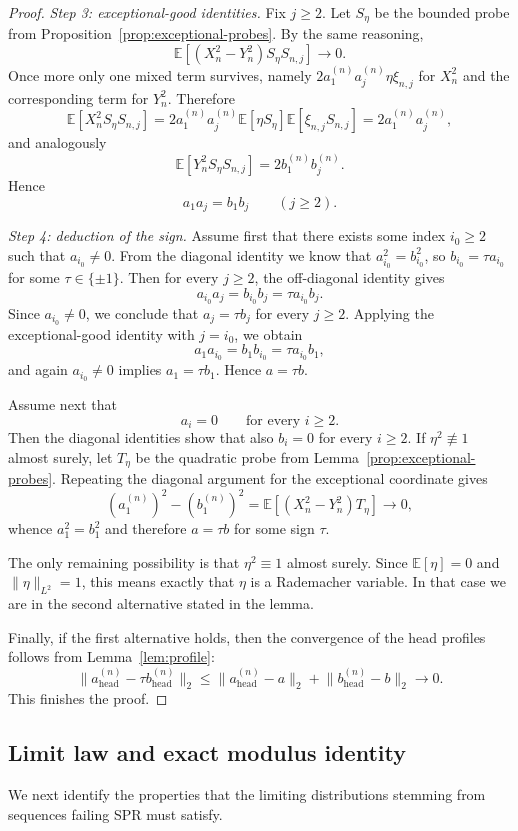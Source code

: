 \documentclass[11pt]{amsart}
\numberwithin{equation}{section}
\theoremstyle{definition}
\theoremstyle{remark}
\newcommand{\E}{\mathbb E}
\newcommand{\norm}[1]{\lVert #1 \rVert}
\begin{document}
\begin{proof}
\smallskip
\noindent\emph{Step 3: exceptional-good identities.}
Fix $j\ge2$.  Let $S_\eta$ be the bounded probe from
Proposition~\ref{prop:exceptional-probes}.  By the same reasoning,
\[
\E[(X_n^2-Y_n^2)S_\eta S_{n,j}]\longrightarrow0.
\]
Once more only one mixed term survives, namely
$2a_1^{(n)}a_j^{(n)}\eta\xi_{n,j}$ for $X_n^2$ and the corresponding term for
$Y_n^2$.  Therefore
\[
\E[X_n^2S_\eta S_{n,j}]
=2a_1^{(n)}a_j^{(n)}\E[\eta S_\eta]\E[\xi_{n,j}S_{n,j}]
=2a_1^{(n)}a_j^{(n)},
\]
and analogously
\[
\E[Y_n^2S_\eta S_{n,j}]
=2b_1^{(n)}b_j^{(n)}.
\]
Hence
\[
a_1a_j=b_1b_j
\qquad(j\ge2).
\]

\smallskip
\noindent\emph{Step 4: deduction of the sign.}
Assume first that there exists some index $i_0\ge2$ such that $a_{i_0}\ne0$.
From the diagonal identity we know that
$a_{i_0}^2=b_{i_0}^2$, so $b_{i_0}=\tau a_{i_0}$ for some
$\tau\in\{\pm1\}$.  Then for every $j\ge2$, the off-diagonal identity gives
\[
a_{i_0}a_j=b_{i_0}b_j=\tau a_{i_0}b_j.
\]
Since $a_{i_0}\ne0$, we conclude that $a_j=\tau b_j$ for every $j\ge2$.
Applying the exceptional-good identity with $j=i_0$, we obtain
\[
a_1a_{i_0}=b_1b_{i_0}=\tau a_{i_0}b_1,
\]
and again $a_{i_0}\ne0$ implies $a_1=\tau b_1$.  Hence $a=\tau b$.

Assume next that
\[
a_i=0
\qquad\text{for every }i\ge2.
\]
Then the diagonal identities show that also $b_i=0$ for every $i\ge2$.
If $\eta^2\not\equiv1$ almost surely, let $T_\eta$ be the quadratic probe from
Lemma~\ref{prop:exceptional-probes}.  Repeating the diagonal argument for
the exceptional coordinate gives
\[
(a_1^{(n)})^2-(b_1^{(n)})^2
=\E[(X_n^2-Y_n^2)T_\eta]
\longrightarrow0,
\]
whence $a_1^2=b_1^2$ and therefore $a=\tau b$ for some sign $\tau$.

The only remaining possibility is that $\eta^2\equiv1$ almost surely.  Since
$\E[\eta]=0$ and $\norm{\eta}_{L^2}=1$, this means exactly that $\eta$ is a
Rademacher variable.  In that case we are in the second alternative stated in
the lemma.

Finally, if the first alternative holds, then the convergence of the head
profiles follows from Lemma~\ref{lem:profile}:
\[
\norm{a_{\mathrm{head}}^{(n)}-\tau b_{\mathrm{head}}^{(n)}}_2
\le
\norm{a_{\mathrm{head}}^{(n)}-a}_2
+
\norm{b_{\mathrm{head}}^{(n)}-b}_2
\longrightarrow0.
\]
This finishes the proof.
\end{proof}

\subsection{Limit law and exact modulus identity} We next identify the properties that the limiting distributions stemming from sequences failing SPR must satisfy. 
\end{document}
